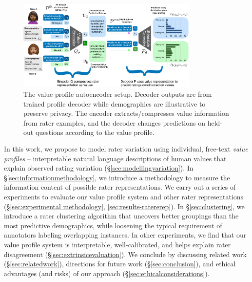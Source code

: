 \documentclass[11pt]{article}
\begin{document}
\begin{figure}[t]
\centering
\includegraphics[width=0.8\textwidth]{files/vp_roma_new.pdf}
\caption{The value profile autoencoder setup. Decoder outputs are from trained profile decoder while demographics are illustrative to preserve privacy. The encoder extracts/compresses value information from rater examples, and the decoder changes predictions on held-out questions according to the value profile.
}
\label{fig:my_label}
\end{figure}

In this work, we propose to model rater variation using individual, free-text {\em value profiles} -- interpretable natural language descriptions of human values that explain observed rating variation (\S \ref{sec:modellingvariation}).
In \S \ref{sec:informationmethodology}, we introduce a methodology to measure the information content of possible rater representations.
We carry out a series of experiments to evaluate our value profile system and other rater representations (\S \ref{sec:experimental methodology}, \ref{sec:results-ratererep}).
In \S \ref{sec:clustering}, we introduce a rater clustering algorithm that uncovers better groupings than the most predictive demographics, while loosening the typical requirement of annotators labeling overlapping instances.
In other experiments, we find that our value profile system is interpretable, well-calibrated, and helps explain rater disagreement (\S \ref{sec:extrinsicevaluation}).
We conclude by discussing related work (\S \ref{sec:relatedwork}), directions for future work (\S \ref{sec:conclusion}),
and ethical advantages (and risks) of our approach (\S \ref{sec:ethicalconsiderations}).
\end{document}
